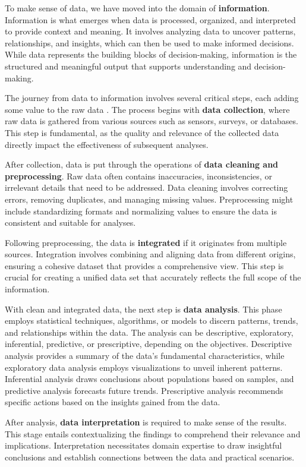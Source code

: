 \documentclass[
  12 pt,
]{Nemilov}
\begin{document}
To make sense of data, we have moved into the domain of \textbf{information}. Information is what emerges when data is processed, organized, and interpreted to provide context and meaning. It involves analyzing data to uncover patterns, relationships, and insights, which can then be used to make informed decisions. While data represents the building blocks of decision-making, information is the structured and meaningful output that supports understanding and decision-making.

The journey from data to information involves several critical steps, each adding some value to the raw data \citep{van2016data}. The process begins with \textbf{data collection}, where raw data is gathered from various sources such as sensors, surveys, or databases. This step is fundamental, as the quality and relevance of the collected data directly impact the effectiveness of subsequent analyses.

After collection, data is put through the operations of \textbf{data cleaning and preprocessing}. Raw data often contains inaccuracies, inconsistencies, or irrelevant details that need to be addressed. Data cleaning involves correcting errors, removing duplicates, and managing missing values. Preprocessing might include standardizing formats and normalizing values to ensure the data is consistent and suitable for analyses.

Following preprocessing, the data is \textbf{integrated} if it originates from multiple sources. Integration involves combining and aligning data from different origins, ensuring a cohesive dataset that provides a comprehensive view. This step is crucial for creating a unified data set that accurately reflects the full scope of the information.

With clean and integrated data, the next step is \textbf{data analysis}. This phase employs statistical techniques, algorithms, or models to discern patterns, trends, and relationships within the data. The analysis can be descriptive, exploratory, inferential, predictive, or prescriptive, depending on the objectives. Descriptive analysis provides a summary of the data's fundamental characteristics, while exploratory data analysis employs visualizations to unveil inherent patterns. Inferential analysis draws conclusions about populations based on samples, and predictive analysis forecasts future trends. Prescriptive analysis recommends specific actions based on the insights gained from the data.

After analysis, \textbf{data interpretation} is required to make sense of the results. This stage entails contextualizing the findings to comprehend their relevance and implications. Interpretation necessitates domain expertise to draw insightful conclusions and establish connections between the data and practical scenarios.
\end{document}

